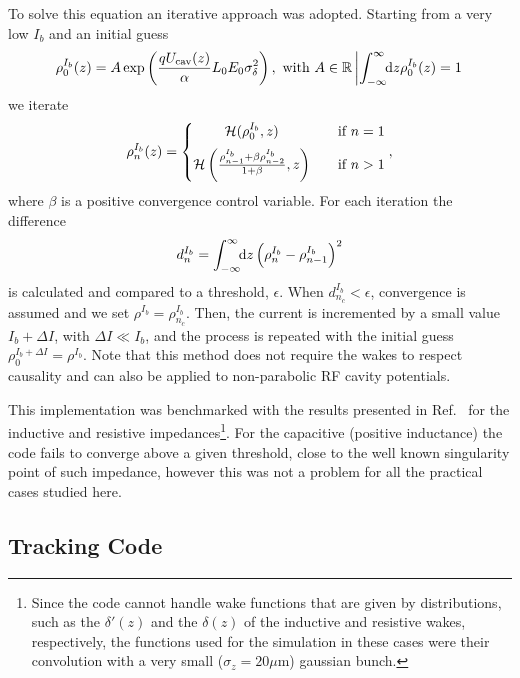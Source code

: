 \begin{apendicesenv}
    To solve this equation an iterative approach was adopted. Starting from a very low $I_b$ and an initial guess
    \begin{align}
        \rho_0^{I_b}(z) = A\exp\left(\frac{qU_\text{cav}(z)}\alpha L_0 E_0 \sigma_\delta^2\right), \,\,
        \text{with}\,\, A \in \mathbb{R} \left| \int_{-\infty}^{\infty}\!\!\text{d}z \rho_0^{I_b}(z)=1\right.
    \end{align}
    we iterate
    \begin{align}
        \rho_n^{I_b}(z) = \left\{
        \begin{matrix}
            \mathcal{H}(\rho_0^{I_b},z)       & \quad \text{if } n = 1\\[2mm]
            \mathcal{H}\left(\frac{\rho_{n-1}^{I_b} + \beta\rho_{n-2}^{I_b}}{1+\beta},z\right) & \quad \text{if } n > 1
        \end{matrix}\right.,
    \end{align}
    where $\beta$ is a positive convergence control variable. For each iteration the difference
    \begin{align}
        d_n^{I_b} = \int_{-\infty}^{\infty}\!\!\text{d}z \left(\rho_n^{I_b}-\rho_{n-1}^{I_b}\right)^2
    \end{align}
    is calculated and compared to a threshold, $\epsilon$. When $d_{n_c}^{I_b}<\epsilon$, convergence is assumed and we set $\rho^{I_b} = \rho_{n_c}^{I_b}$. Then, the current is incremented by a small value $I_b + \Delta I$, with $\Delta I \ll I_b$, and the process is repeated with the initial guess $\rho_0^{I_b+\Delta I} = \rho^{I_b}$. Note that this method does not require the wakes to respect causality and can also be applied to non-parabolic RF cavity potentials.

    This implementation was benchmarked with the results presented in Ref.~ for the inductive and resistive impedances\footnote{Since the code cannot handle wake functions that are given by distributions, such as the $\delta'(z)$ and the $\delta(z)$ of the inductive and resistive wakes, respectively, the functions used for the simulation in these cases were their convolution with a very small ($\sigma_z=20\mu$m) gaussian bunch.}. For the capacitive (positive inductance) the code fails to converge above a given threshold, close to the well known singularity point of such impedance\cite{Shobuda1999}, however this was not a problem for all the practical cases studied here.

\subsection{Tracking Code}


\end{apendicesenv}
